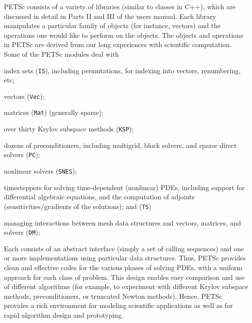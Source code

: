 %
%
%

\label{sec_gettingstarted}

PETSc consists of a variety of libraries (similar to classes in C++),
which are discussed in detail in Parts II and III of the users manual.
Each library manipulates a particular family of objects (for instance,
vectors) and the operations one would like to perform on the objects.
The objects and operations in PETSc are derived from our long
experiences with scientific computation. Some of the PETSc modules deal with
\begin{tightitemize}
  \item index sets (\lstinline{IS}), including permutations, for indexing into vectors, renumbering, etc;
  \item vectors (\lstinline{Vec});
  \item matrices (\lstinline{Mat}) (generally sparse);
  \item over thirty Krylov subspace methods (\lstinline{KSP});
  \item dozens of preconditioners, including multigrid, block solvers, and sparse direct solvers (\lstinline{PC});
  \item nonlinear solvers (\lstinline{SNES});
  \item timesteppers for solving time-dependent (nonlinear) PDEs, including support for differential algebraic equations,
        and the computation of adjoints (sensitivities/gradients of the solutions); and (\lstinline{TS})
  \item managing interactions between mesh data structures and vectors, matrices, and solvers (\lstinline{DM});
\end{tightitemize}
Each consists of an abstract interface
(simply a set of calling sequences) and one or more implementations
using particular data structures. Thus, PETSc provides clean and
effective codes for the various phases of solving PDEs, with a uniform
approach for each class of problem.  This design
enables easy comparison and use of different algorithms (for example,
to experiment with different Krylov subspace methods, preconditioners,
or truncated Newton methods).
Hence, PETSc provides a rich environment for modeling scientific
applications as well as for rapid algorithm design and prototyping.

